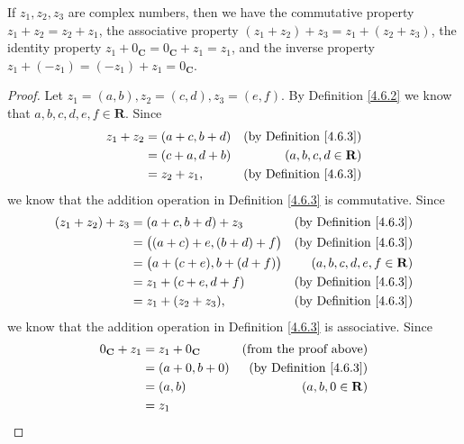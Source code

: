 \begin{lemma}\label{4.6.4}
    If \(z_1, z_2, z_3\) are complex numbers, then we have the commutative property \(z_1 + z_2 = z_2 + z_1\), the associative property \((z_1 + z_2) + z_3 = z_1 + (z_2 + z_3)\), the identity property \(z_1 + 0_{\mathbf{C}} = 0_{\mathbf{C}} + z_1 = z_1\), and the inverse property \(z_1 + (-z_1) = (-z_1) + z_1 = 0_{\mathbf{C}}\).
\end{lemma}

\begin{proof}
    Let \(z_1 = (a, b), z_2 = (c, d), z_3 = (e, f)\).
    By Definition \ref{4.6.2} we know that \(a, b, c, d, e, f \in \mathbf{R}\).
    Since
    \begin{align*}
        z_1 + z_2 & = (a + c, b + d) & \text{(by Definition \ref{4.6.3})} \\
                  & = (c + a, d + b) & (a, b, c, d \in \mathbf{R})        \\
                  & = z_2 + z_1,     & \text{(by Definition \ref{4.6.3})}
    \end{align*}
    we know that the addition operation in Definition \ref{4.6.3} is commutative.
    Since
    \begin{align*}
        (z_1 + z_2) + z_3 & = (a + c, b + d) + z_3               & \text{(by Definition \ref{4.6.3})} \\
                          & = \big((a + c) + e, (b + d) + f\big) & \text{(by Definition \ref{4.6.3})} \\
                          & = \big(a + (c + e), b + (d + f)\big) & (a, b, c, d, e, f \in \mathbf{R})  \\
                          & = z_1 + (c + e, d + f)               & \text{(by Definition \ref{4.6.3})} \\
                          & = z_1 + (z_2 + z_3),                 & \text{(by Definition \ref{4.6.3})}
    \end{align*}
    we know that the addition operation in Definition \ref{4.6.3} is associative.
    Since
    \begin{align*}
        0_{\mathbf{C}} + z_1 & = z_1 + 0_{\mathbf{C}} & \text{(from the proof above)}      \\
                             & = (a + 0, b + 0)       & \text{(by Definition \ref{4.6.3})} \\
                             & = (a, b)               & (a, b, 0 \in \mathbf{R})           \\
                             & = z_1

\end{align*}
\end{proof}
